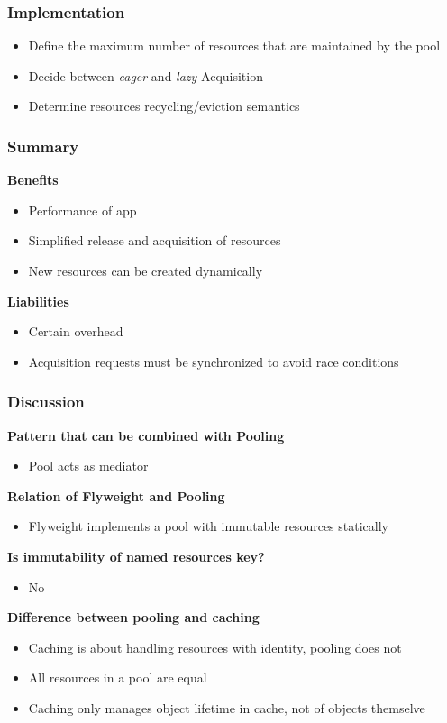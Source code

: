 \subsubsection{Implementation}
\begin{itemize}
    \item Define the maximum number of resources that are maintained by the pool
    \item Decide between \textit{eager} and \textit{lazy} Acquisition
    \item Determine resources recycling/eviction semantics
\end{itemize}
\subsubsection{Summary}
\textbf{Benefits}
\begin{itemize}
    \item Performance of app
    \item Simplified release and acquisition of resources
    \item New resources can be created dynamically
\end{itemize}
\textbf{Liabilities}
\begin{itemize}
    \item Certain overhead
    \item Acquisition requests must be synchronized to avoid race conditions
\end{itemize}
\subsubsection{Discussion}
\textbf{Pattern that can be combined with Pooling}
\begin{itemize}
    \item Pool acts as mediator
\end{itemize}
\textbf{Relation of Flyweight and Pooling}
\begin{itemize}
    \item Flyweight implements a pool with immutable resources statically
\end{itemize}
\textbf{Is immutability of named resources key?}
\begin{itemize}
    \item No
\end{itemize}
\textbf{Difference between pooling and caching}
\begin{itemize}
    \item Caching is about handling resources with identity, pooling does not
    \item All resources in a pool are equal
    \item Caching only manages object lifetime in cache, not of objects themselve
\end{itemize}
